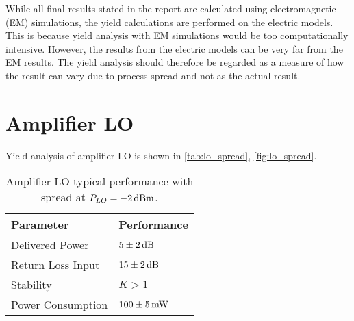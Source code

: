 		While all final results stated in the report are calculated using electromagnetic (EM) simulations, the yield calculations are performed on the electric models. This is because yield analysis with EM simulations would be too computationally intensive. However, the results from the electric models can be very far from the EM results. The yield analysis should therefore be regarded as a measure of how the result can vary due to process spread and not as the actual result.


	\section{Amplifier LO}\label{yieldlo}
		Yield analysis of amplifier LO is shown in \autoref{tab:lo_spread}, \autoref{fig:lo_spread}.


		\begin{table}[hbt!]
			\caption[Amplifier LO performance with spread.]{Amplifier LO typical performance with spread at $P_{LO}=\unit[-2]{dBm}$.}
			\label{tab:lo_spread}
			\centering
			\begin{tabular}{ l l } \toprule
				Parameter & Performance \\\midrule
				Delivered Power & $\unit[5\pm2]{dB}$ \\
				Return Loss Input & $\unit[15\pm2 ]{dB}$ \\
				Stability & $K>1$ \\
				Power Consumption &  $\unit[100\pm 5]{mW}$ \\\bottomrule
			\end{tabular}
		\end{table}		
		

